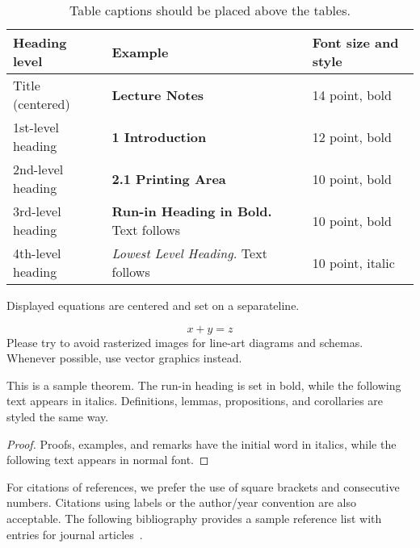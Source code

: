 \documentclass[runningheads]{llncs}
\begin{document}
\begin{table}
    \caption{Table captions should be placed above the tables.}
    \label{tab1}
    \begin{tabular}{|l|l|l|}
        \hline
        Heading level     & Example                                          & Font size and style \\
        \hline
        Title (centered)  & {\Large\bfseries Lecture Notes}                  & 14 point, bold      \\
        1st-level heading & {\large\bfseries 1 Introduction}                 & 12 point, bold      \\
        2nd-level heading & {\bfseries 2.1 Printing Area}                    & 10 point, bold      \\
        3rd-level heading & {\bfseries Run-in Heading in Bold.} Text follows & 10 point, bold      \\
        4th-level heading & {\itshape Lowest Level Heading.} Text follows    & 10 point, italic    \\
        \hline
    \end{tabular}
\end{table}


\noindent Displayed equations are centered and set on a separateline.

\begin{equation}
    x + y = z
\end{equation}
Please try to avoid rasterized images for line-art diagrams and schemas. Whenever possible, use 
vector graphics instead.


\begin{theorem}
    This is a sample theorem. The run-in heading is set in bold, while
    the following text appears in italics. Definitions, lemmas,
    propositions, and corollaries are styled the same way.
\end{theorem}
%
%
\begin{proof}
    Proofs, examples, and remarks have the initial word in italics,
    while the following text appears in normal font.
\end{proof}
For citations of references, we prefer the use of square brackets
and consecutive numbers. Citations using labels or the author/year
convention are also acceptable. The following bibliography provides
a sample reference list with entries for journal
articles~\cite{Dardha2017}.



\end{document}
